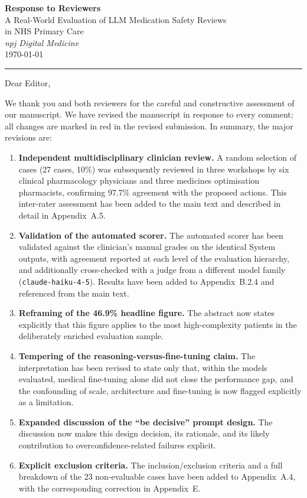 \documentclass[11pt,a4paper]{article}
\begin{document}
\begin{center}
  {\LARGE\bfseries Response to Reviewers}\\[0.8em]
  {\large A Real-World Evaluation of LLM Medication Safety Reviews\\ in NHS Primary Care}\\[0.6em]
  {\itshape npj Digital Medicine}\\[0.4em]
  \today
\end{center}

\vspace{0.5em}
\hrule
\vspace{1.2em}

Dear Editor,

We thank you and both reviewers for the careful and constructive assessment of our manuscript. We have revised the manuscript in response to every comment; all changes are marked in red in the revised submission. In summary, the major revisions are:

\begin{enumerate}[leftmargin=2em, itemsep=0.2em]
  \item \textbf{Independent multidisciplinary clinician review.} A random selection of cases (27 cases, 10\%) was subsequently reviewed in three workshops by six clinical pharmacology physicians and three medicines optimisation pharmacists, confirming 97.7\% agreement with the proposed actions. This inter-rater assessment has been added to the main text and described in detail in Appendix~A.5.
  \item \textbf{Validation of the automated scorer.} The automated scorer has been validated against the clinician's manual grades on the identical System outputs, with agreement reported at each level of the evaluation hierarchy, and additionally cross-checked with a judge from a different model family (\texttt{claude-haiku-4-5}). Results have been added to Appendix~B.2.4 and referenced from the main text.
  \item \textbf{Reframing of the 46.9\% headline figure.} The abstract now states explicitly that this figure applies to the most high-complexity patients in the deliberately enriched evaluation sample.
  \item \textbf{Tempering of the reasoning-versus-fine-tuning claim.} The interpretation has been revised to state only that, within the models evaluated, medical fine-tuning alone did not close the performance gap, and the confounding of scale, architecture and fine-tuning is now flagged explicitly as a limitation.
  \item \textbf{Expanded discussion of the ``be decisive'' prompt design.} The discussion now makes this design decision, its rationale, and its likely contribution to overconfidence-related failures explicit.
  \item \textbf{Explicit exclusion criteria.} The inclusion/exclusion criteria and a full breakdown of the 23 non-evaluable cases have been added to Appendix~A.4, with the corresponding correction in Appendix~E.
\end{enumerate}
\end{document}
